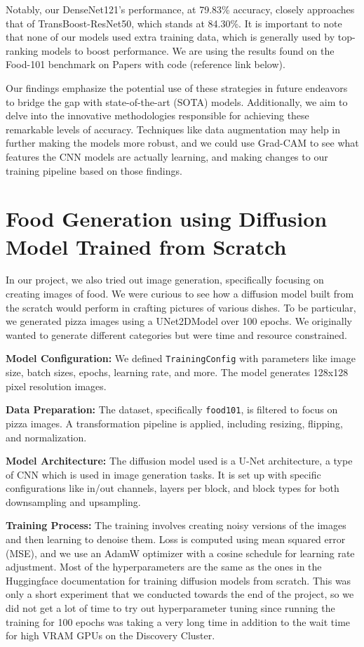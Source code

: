 \documentclass{article}
\begin{document}
Notably, our DenseNet121's performance, at 79.83\% accuracy, closely approaches that of TransBoost-ResNet50, which stands at 84.30\%. It is important to note that none of our models used extra training data, which is generally used by top-ranking models to boost performance. We are using the results found on the Food-101 benchmark on Papers with code (reference link below).

Our findings emphasize the potential use of these strategies in future endeavors to bridge the gap with state-of-the-art (SOTA) models. Additionally, we aim to delve into the innovative methodologies responsible for achieving these remarkable levels of accuracy. Techniques like data augmentation may help in further making the models more robust, and we could use Grad-CAM to see what features the CNN models are actually learning, and making changes to our training pipeline based on those findings.

\section{Food Generation using Diffusion Model Trained from Scratch}

In our project, we also tried out image generation, specifically focusing on creating images of food. We were curious to see how a diffusion model built from the scratch would perform in crafting pictures of various dishes.  To be particular, we generated pizza images using a UNet2DModel over 100 epochs. We originally wanted to generate different categories but were time and resource constrained.

\textbf{Model Configuration:} We defined \verb|TrainingConfig| with parameters like image size, batch sizes, epochs, learning rate, and more. The model generates 128x128 pixel resolution images.

\textbf{Data Preparation:} The dataset, specifically \verb|food101|, is filtered to focus on pizza images. A transformation pipeline is applied, including resizing, flipping, and normalization.

\textbf{Model Architecture:} The diffusion model used is a U-Net architecture, a type of CNN which is used in image generation tasks. It is set up with specific configurations like in/out channels, layers per block, and block types for both downsampling and upsampling.

\textbf{Training Process:} The training involves creating noisy versions of the images and then learning to denoise them. Loss is computed using mean squared error (MSE), and we use an AdamW optimizer with a cosine schedule for learning rate adjustment. Most of the hyperparameters are the same as the ones in the Huggingface documentation for training diffusion models from scratch. This was only a short experiment that we conducted towards the end of the project, so we did not get a lot of time to try out hyperparameter tuning since running the training for 100 epochs was taking a very long time in addition to the wait time for high VRAM GPUs on the Discovery Cluster.
\end{document}
